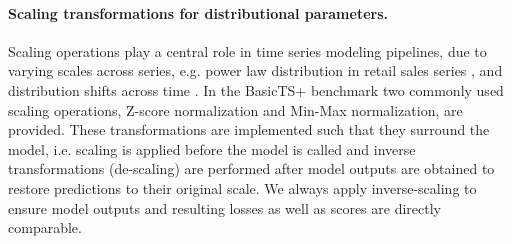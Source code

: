 \documentclass[a4paper,oneside,bibliography=totoc]{scrbook}
\begin{document}
\paragraph{Scaling transformations for distributional parameters.}
\label{sec:scaling}


Scaling operations play a central role in time series modeling pipelines, due to varying scales across series, e.g. power law distribution in retail sales series \cite{salinas_deepar_2020, salinas_high-dimensional_2019}, and distribution shifts across time \cite{fan_dish-ts_2023, zhang_probts_2024, kim_reversible_2021, nie_time_2022}. %
In the BasicTS+ benchmark two commonly used scaling operations, Z-score normalization and Min-Max normalization, are provided. 
These transformations are implemented such that they surround the model, i.e. scaling is applied before the model is called and inverse transformations (de-scaling) are performed after model outputs are obtained to restore predictions to their original scale.
We always apply inverse-scaling to ensure model outputs and resulting losses as well as scores are directly comparable.
\end{document}

